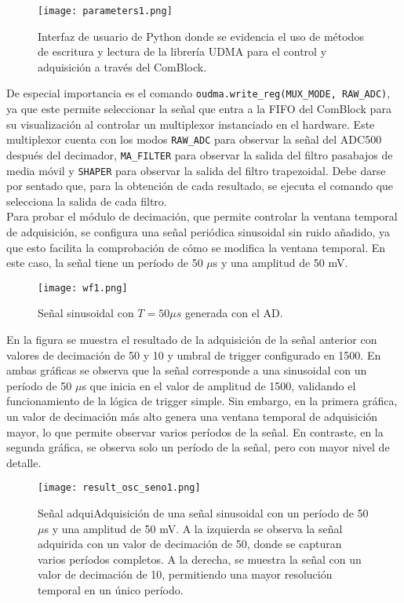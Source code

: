 \documentclass{report}
\begin{document}
\begin{figure}[H]
    \centering
    \texttt{[image: parameters1.png]}
    \caption{Interfaz de usuario de Python donde se evidencia el uso de métodos de escritura y lectura de la librería UDMA para el control y adquisición a través del ComBlock.}
    \label{fig:parameters1}
\end{figure}

\noindent De especial importancia es el comando \texttt{oudma.write\_reg(MUX\_MODE, RAW\_ADC)}, ya que este permite seleccionar la señal que entra a la FIFO del ComBlock para su visualización al controlar un multiplexor instanciado en el hardware. Este multiplexor cuenta con los modos \texttt{RAW\_ADC} para observar la señal del ADC500 después del decimador, \texttt{MA\_FILTER} para observar la salida del filtro pasabajos de media móvil y \texttt{SHAPER} para observar la salida del filtro trapezoidal. Debe darse por sentado que, para la obtención de cada resultado, se ejecuta el comando que selecciona la salida de cada filtro.\\

\noindent Para probar el módulo de decimación, que permite controlar la ventana temporal de adquisición, se configura una señal periódica sinusoidal sin ruido añadido, ya que esto facilita la comprobación de cómo se modifica la ventana temporal. En este caso, la señal tiene un período de 50 $\mu$s y una amplitud de 50 mV.

\begin{figure}[H]
    \centering
    \texttt{[image: wf1.png]}
    \caption{Señal sinusoidal con $T = 50 \mu s$ generada con el AD.}
    \label{fig:signal1AD}
\end{figure}

\noindent En la figura se muestra el resultado de la adquisición de la señal anterior con valores de decimación de 50 y 10 y umbral de trigger configurado en 1500. En ambas gráficas se observa que la señal corresponde a una sinusoidal con un período de 50 $\mu$s que inicia en el valor de amplitud de 1500, validando el funcionamiento de la lógica de trigger simple. Sin embargo, en la primera gráfica, un valor de decimación más alto genera una ventana temporal de adquisición mayor, lo que permite observar varios períodos de la señal. En contraste, en la segunda gráfica, se observa solo un período de la señal, pero con mayor nivel de detalle. 

\begin{figure}[H]
    \centering
    \texttt{[image: result\_osc\_seno1.png]}
    \caption{Señal adquiAdquisición de una señal sinusoidal con un período de 50 $\mu$s y una amplitud de 50 mV. A la izquierda se observa la señal adquirida con un valor de decimación de 50, donde se capturan varios períodos completos. A la derecha, se muestra la señal con un valor de decimación de 10, permitiendo una mayor resolución temporal en un único período.}
    \label{fig:signal1DAQ}
\end{figure}
\end{document}
